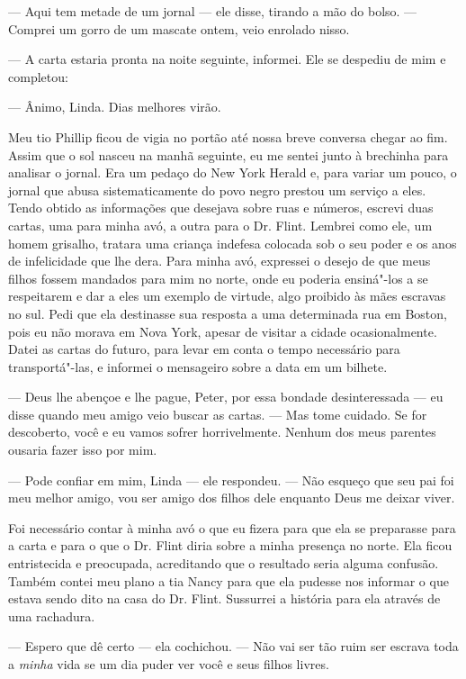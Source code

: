 --- Aqui tem metade de um jornal --- ele disse, tirando a mão do bolso.
--- Comprei um gorro de um mascate ontem, veio enrolado nisso.

--- A carta estaria pronta na noite seguinte, informei. Ele se despediu
de mim e completou:

--- Ânimo, Linda. Dias melhores virão.

Meu tio Phillip ficou de vigia no
portão até nossa breve conversa chegar ao fim. Assim que o sol nasceu na
manhã seguinte, eu me sentei junto à brechinha para analisar o jornal.
Era um pedaço do New York Herald e, para variar um pouco, o jornal que
abusa sistematicamente do povo negro prestou um serviço a eles. Tendo
obtido as informações que desejava sobre ruas e números, escrevi duas
cartas, uma para minha avó, a outra para o Dr. Flint. Lembrei como ele,
um homem grisalho, tratara uma criança indefesa colocada sob o seu poder
e os anos de infelicidade que lhe dera. Para minha avó, expressei o
desejo de que meus filhos fossem mandados para mim no norte, onde eu
poderia ensiná"-los a se respeitarem e dar a eles um exemplo de virtude,
algo proibido às mães escravas no sul. Pedi que ela destinasse sua
resposta a uma determinada rua em Boston, pois eu não morava em Nova
York, apesar de visitar a cidade ocasionalmente. Datei as cartas do
futuro, para levar em conta o tempo necessário para transportá"-las, e
informei o mensageiro sobre a data em um bilhete.

--- Deus lhe abençoe e lhe pague, Peter, por essa bondade desinteressada
--- eu disse quando meu amigo veio buscar as cartas. --- Mas tome
cuidado. Se for descoberto, você e eu vamos sofrer horrivelmente. Nenhum
dos meus parentes ousaria fazer isso por mim.

--- Pode confiar em mim, Linda --- ele respondeu. --- Não esqueço que
seu pai foi meu melhor amigo, vou ser amigo dos filhos dele enquanto
Deus me deixar viver.

Foi necessário contar à minha avó o que
eu fizera para que ela se preparasse para a carta e para o que o Dr.
Flint diria sobre a minha presença no norte. Ela ficou entristecida e
preocupada, acreditando que o resultado seria alguma confusão. Também
contei meu plano a tia Nancy para que ela pudesse nos informar o que
estava sendo dito na casa do Dr. Flint. Sussurrei a história para ela
através de uma rachadura.

--- Espero que dê certo --- ela cochichou. --- Não vai ser tão ruim ser
escrava toda a \emph{minha} vida se um dia puder ver você e seus filhos
livres.

